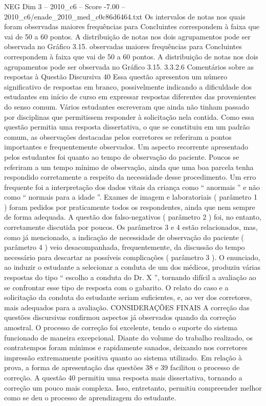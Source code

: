 \begin{textsample}{NEG Dim 3 – 2010\_c6 – Score -7.00 – 2010\_c6/enade\_2010\_med\_c0c86d6464.txt}
Os intervalos de notas nos quais foram observadas maiores frequências para Concluintes correspondem à faixa que vai de 50 a 60 pontos.
A distribuição de notas nos dois agrupamentos pode ser observada no Gráfico 3.15. observadas maiores frequências para Concluintes correspondem à faixa que vai de 50 a 60 pontos.
A distribuição de notas nos dois agrupamentos pode ser observada no Gráfico 3.15. 3.3.2.6 Comentários sobre as respostas à Questão Discursiva 40 Essa questão apresentou um número significativo de respostas em branco, possivelmente indicando a dificuldade dos estudantes em início de curso em expressar respostas diferentes das provenientes do senso comum.
Vários estudantes escreveram que ainda não tinham passado por disciplinas que permitissem responder à solicitação nela contida.
Como essa questão permitia uma resposta dissertativa, o que se constituiu em um padrão comum, as observações destacadas pelos corretores se referiram a pontos importantes e frequentemente observados.
Um aspecto recorrente apresentado pelos estudantes foi quanto ao tempo de observação do paciente.
Poucos se referiram a um tempo mínimo de observação, ainda que uma boa parcela tenha respondido corretamente a respeito da necessidade desse procedimento.
Um erro frequente foi a interpretação dos dados vitais da criança como “ anormais ” e não como “ normais para a idade ”.
Exames de imagem e laboratoriais ( parâmetro 1 ) foram pedidos por praticamente todos os respondentes, ainda que nem sempre de forma adequada.
A questão dos falso-negativos ( parâmetro 2 ) foi, no entanto, corretamente discutida por poucos.
Os parâmetros 3 e 4 estão relacionados, mas, como já mencionado, a indicação de necessidade de observação do paciente ( parâmetro 4 ) veio desacompanhada, frequentemente, da discussão do tempo necessário para descartar as possíveis complicações ( parâmetro 3 ).
O enunciado, ao induzir o estudante a selecionar a conduta de um dos médicos, produziu várias respostas do tipo “ escolho a conduta do Dr.
X ”, tornando difícil a avaliação ao se confrontar esse tipo de resposta com o gabarito.
O relato do caso e a solicitação da conduta do estudante seriam suficientes, e, ao ver dos corretores, mais adequados para a avaliação.
CONSIDERAÇÕES FINAIS A correção das questões discursivas confirmou aspectos já observados quando da correção amostral.
O processo de correção foi excelente, tendo o suporte do sistema funcionado de maneira excepcional.
Diante do volume do trabalho realizado, os contratempos foram mínimos e rapidamente sanados, deixando nos corretores impressão extremamente positiva quanto ao sistema utilizado.
Em relação à prova, a forma de apresentação das questões 38 e 39 facilitou o processo de correção.
A questão 40 permitiu uma resposta mais dissertativa, tornando a correção um pouco mais complexa.
Isso, entretanto, permitiu compreender melhor como se deu o processo de aprendizagem do estudante.

\end{textsample}
